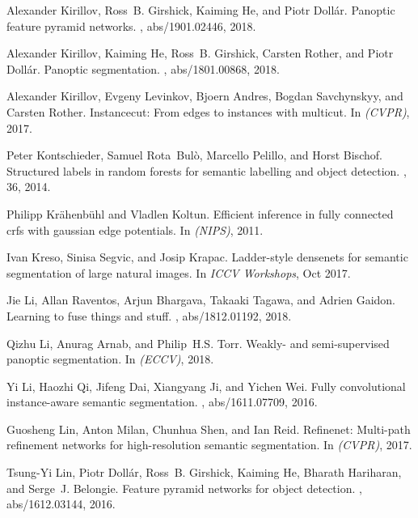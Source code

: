 \documentclass[10pt,twocolumn,letterpaper]{article}
\begin{document}
{\begin{thebibliography}{10}
Alexander Kirillov, Ross~B. Girshick, Kaiming He, and Piotr Doll{\'{a}}r.
\newblock Panoptic feature pyramid networks.
, abs/1901.02446, 2018.

Alexander Kirillov, Kaiming He, Ross~B. Girshick, Carsten Rother, and Piotr
  Doll{\'{a}}r.
\newblock Panoptic segmentation.
, abs/1801.00868, 2018.

Alexander Kirillov, Evgeny Levinkov, Bjoern Andres, Bogdan Savchynskyy, and
  Carsten Rother.
\newblock Instancecut: From edges to instances with multicut.
\newblock In {\em (CVPR)}, 2017.

Peter Kontschieder, Samuel {Rota~Bul\`o}, Marcello Pelillo, and Horst Bischof.
\newblock Structured labels in random forests for semantic labelling and object
  detection.
, 36, 2014.

Philipp Kr\"{a}henb\"{u}hl and Vladlen Koltun.
\newblock Efficient inference in fully connected crfs with gaussian edge
  potentials.
\newblock In {\em (NIPS)}, 2011.

Ivan Kreso, Sinisa Segvic, and Josip Krapac.
\newblock Ladder-style densenets for semantic segmentation of large natural
  images.
\newblock In {\em ICCV Workshops}, Oct 2017.

Jie Li, Allan Raventos, Arjun Bhargava, Takaaki Tagawa, and Adrien Gaidon.
\newblock Learning to fuse things and stuff.
, abs/1812.01192, 2018.

Qizhu Li, Anurag Arnab, and Philip~H.S. Torr.
\newblock Weakly- and semi-supervised panoptic segmentation.
\newblock In {\em (ECCV)}, 2018.

Yi Li, Haozhi Qi, Jifeng Dai, Xiangyang Ji, and Yichen Wei.
\newblock Fully convolutional instance-aware semantic segmentation.
, abs/1611.07709, 2016.

Guosheng Lin, Anton Milan, Chunhua Shen, and Ian Reid.
\newblock Refinenet: Multi-path refinement networks for high-resolution
  semantic segmentation.
\newblock In {\em (CVPR)}, 2017.

Tsung{-}Yi Lin, Piotr Doll{\'{a}}r, Ross~B. Girshick, Kaiming He, Bharath
  Hariharan, and Serge~J. Belongie.
\newblock Feature pyramid networks for object detection.
, abs/1612.03144, 2016.


\end{thebibliography}}
\end{document}
